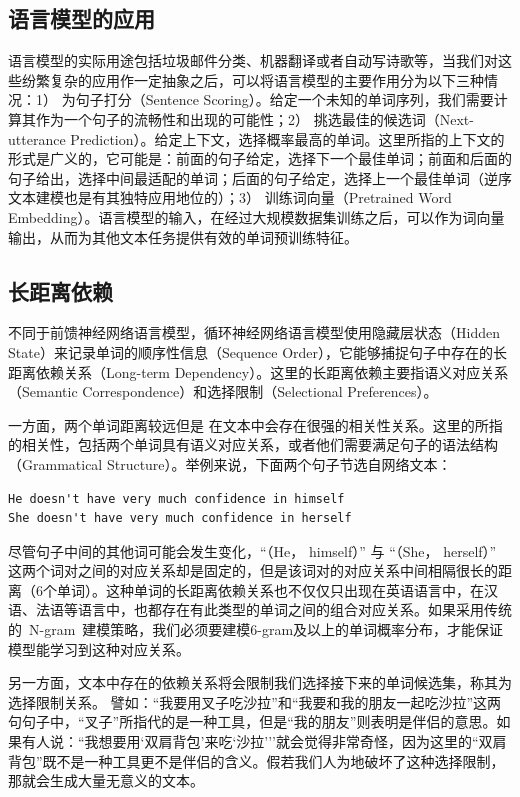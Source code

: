 \subsection{语言模型的应用}
语言模型的实际用途包括垃圾邮件分类、机器翻译或者自动写诗歌等，当我们对这些纷繁复杂的应用作一定抽象之后，可以将语言模型的主要作用分为以下三种情况：1） 为句子打分（Sentence Scoring）。给定一个未知的单词序列，我们需要计算其作为一个句子的流畅性和出现的可能性；2） 挑选最佳的候选词（Next-utterance Prediction）。给定上下文，选择概率最高的单词。这里所指的上下文的形式是广义的，它可能是：前面的句子给定，选择下一个最佳单词；前面和后面的句子给出，选择中间最适配的单词；后面的句子给定，选择上一个最佳单词（逆序文本建模也是有其独特应用地位的）；3） 训练词向量（Pretrained Word Embedding）。语言模型的输入，在经过大规模数据集训练之后，可以作为词向量输出，从而为其他文本任务提供有效的单词预训练特征。

\subsection{长距离依赖}
不同于前馈神经网络语言模型，循环神经网络语言模型使用隐藏层状态（Hidden State）来记录单词的顺序性信息（Sequence Order），它能够捕捉句子中存在的长距离依赖关系（Long-term Dependency）。这里的长距离依赖主要指语义对应关系（Semantic Correspondence）和选择限制（Selectional Preferences）。

一方面，两个单词距离较远但是 在文本中会存在很强的相关性关系。这里的所指的相关性，包括两个单词具有语义对应关系，或者他们需要满足句子的语法结构（Grammatical Structure）。举例来说，下面两个句子节选自网络文本：
\begin{verbatim}
He doesn't have very much confidence in himself
She doesn't have very much confidence in herself
\end{verbatim}
尽管句子中间的其他词可能会发生变化，``（He， himself）'' 与 ``（She， herself）'' 这两个词对之间的对应关系却是固定的，但是该词对的对应关系中间相隔很长的距离（6个单词）。这种单词的长距离依赖关系也不仅仅只出现在英语语言中，在汉语、法语等语言中，也都存在有此类型的单词之间的组合对应关系。如果采用传统的~N-gram~建模策略，我们必须要建模6-gram及以上的单词概率分布，才能保证模型能学习到这种对应关系。

另一方面，文本中存在的依赖关系将会限制我们选择接下来的单词候选集，称其为选择限制关系。
譬如：``我要用叉子吃沙拉''和``我要和我的朋友一起吃沙拉''这两句句子中，``叉子''所指代的是一种工具，但是``我的朋友''则表明是伴侣的意思。如果有人说：``我想要用`双肩背包'来吃`沙拉'''就会觉得非常奇怪，因为这里的``双肩背包''既不是一种工具更不是伴侣的含义。假若我们人为地破坏了这种选择限制，那就会生成大量无意义的文本。

